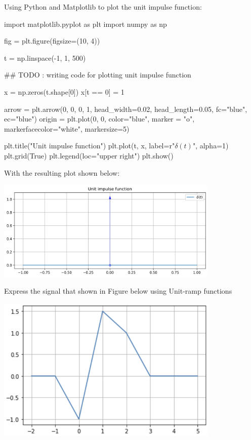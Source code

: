 \documentclass[a4paper, 10pt]{article}
\begin{document}
\begin{solution}
Using Python and Matplotlib to plot the unit impulse function:
\begin{codingbox}
import matplotlib.pyplot as plt
import numpy as np

fig = plt.figure(figsize=(10, 4))

t = np.linspace(-1, 1, 500)

## TODO : writing code for plotting unit impulse function

x = np.zeros(t.shape[0])
x[t == 0] = 1

arrow = plt.arrow(0, 0, 0, 1, head_width=0.02, head_length=0.05, fc="blue", ec="blue")
origin = plt.plot(0, 0, color="blue", marker = "o", markerfacecolor="white", markersize=5)

plt.title("Unit impulse function")
plt.plot(t, x, label=r"$\delta(t)$", alpha=1)
plt.grid(True)
plt.legend(loc="upper right")
plt.show()
\end{codingbox}

With the resulting plot shown below:
\begin{center}
    \includegraphics[width=0.8\textwidth]{images/problem_7_2.png}
\end{center}
\end{solution}

\newpage

\begin{problem}
Express the signal that shown in Figure below using Unit-ramp functions

\begin{center}
    \includegraphics[width=0.8\textwidth]{images/problem_8_reference.png}
\end{center}
\end{problem}
\end{document}
